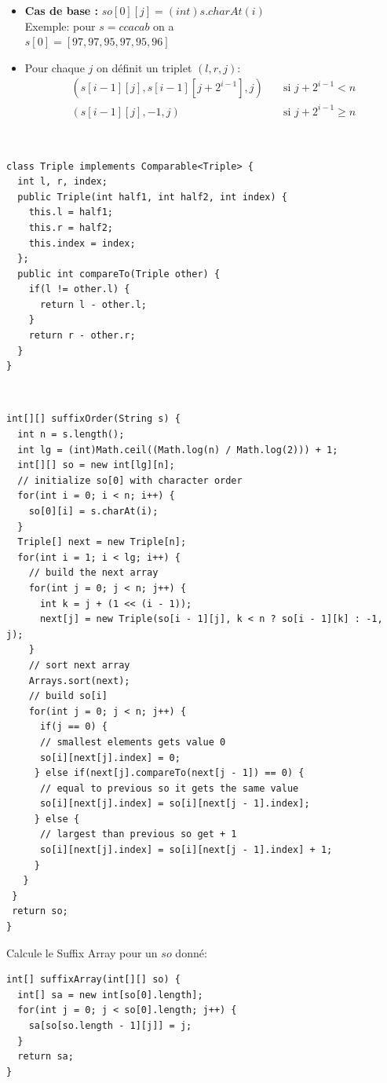 \begin{itemize}

\item\textbf{Cas de base : }$so[0][j] = (int)s.charAt(i) $\\
Exemple: pour $s = ccacab$ on a \\$ s[0] = [97, 97, 95, 97, 95, 96]$
\item Pour chaque $j$ on définit un triplet $(l, r, j)$:
\begin{align*}
(s[i - 1][j], s[i - 1][j + 2^{i - 1}], j) & \quad \text{si $j + 2^{i - 1} < n$} \\
(s[i - 1][j], -1, j) & \quad \text{si $j + 2^{i - 1} \geq n$}
\end{align*}

\end{itemize}
\ \newline
\begin{lstlisting}
class Triple implements Comparable<Triple> {
  int l, r, index;
  public Triple(int half1, int half2, int index) {
    this.l = half1;
    this.r = half2;
    this.index = index;
  };
  public int compareTo(Triple other) {
    if(l != other.l) {
      return l - other.l;
    }
    return r - other.r;
  }
} 
\end{lstlisting}
\ \newline
\begin{lstlisting}
int[][] suffixOrder(String s) {
  int n = s.length();
  int lg = (int)Math.ceil((Math.log(n) / Math.log(2))) + 1;
  int[][] so = new int[lg][n];
  // initialize so[0] with character order
  for(int i = 0; i < n; i++) {
    so[0][i] = s.charAt(i);
  }
  Triple[] next = new Triple[n];
  for(int i = 1; i < lg; i++) {
    // build the next array
    for(int j = 0; j < n; j++) {
      int k = j + (1 << (i - 1));
      next[j] = new Triple(so[i - 1][j], k < n ? so[i - 1][k] : -1, j);
    }
    // sort next array
    Arrays.sort(next);
    // build so[i]
    for(int j = 0; j < n; j++) {
      if(j == 0) {
      // smallest elements gets value 0 
      so[i][next[j].index] = 0;
     } else if(next[j].compareTo(next[j - 1]) == 0) {
      // equal to previous so it gets the same value
      so[i][next[j].index] = so[i][next[j - 1].index];
     } else {
      // largest than previous so get + 1
      so[i][next[j].index] = so[i][next[j - 1].index] + 1;
     }
   }
 }
 return so;
}
\end{lstlisting}

Calcule le Suffix Array pour un $so$ donné:\ \newline
\begin{lstlisting}
int[] suffixArray(int[][] so) {
  int[] sa = new int[so[0].length];
  for(int j = 0; j < so[0].length; j++) {
    sa[so[so.length - 1][j]] = j;
  }
  return sa;
}
\end{lstlisting}

